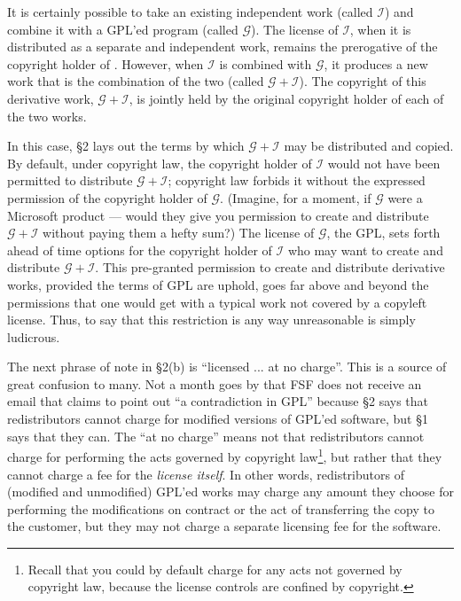 \documentclass[12pt]{report}
\begin{document}
\newcommand{\gplusi}{$\mathcal{G\!\!+\!\!I}$}
\newcommand{\worki}{$\mathcal{I}$}
\newcommand{\workg}{$\mathcal{G}$}

It is certainly possible to take an existing independent work (called
\worki{}) and combine it with a GPL'ed program (called \workg{}).  The
license of \worki{}, when it is distributed as a separate and independent
work, remains the prerogative of the copyright holder of .  However, when
\worki{} is combined with \workg{}, it produces a new work that is the
combination of the two (called \gplusi{}).  The copyright of this
derivative work, \gplusi{}, is jointly held by the original copyright
holder of each of the two works.

In this case, \S 2 lays out the terms by which \gplusi{} may be
distributed and copied.  By default, under copyright law, the copyright
holder of \worki{} would not have been permitted to distribute \gplusi{};
copyright law forbids it without the expressed permission of the copyright
holder of \workg{}.  (Imagine, for a moment, if \workg{} were a Microsoft
product --- would they give you permission to create and distribute
\gplusi{} without paying them a hefty sum?)  The license of \workg{}, the
GPL, sets forth ahead of time options for the copyright holder of \worki{}
who may want to create and distribute \gplusi{}.  This pre-granted
permission to create and distribute derivative works, provided the terms
of GPL are uphold, goes far above and beyond the permissions that one
would get with a typical work not covered by a copyleft license.  Thus, to
say that this restriction is any way unreasonable is simply ludicrous.

\medskip

The next phrase of note in \S 2(b) is ``licensed ... at no charge''.  This
is a source of great confusion to many.  Not a month goes by that FSF does
not receive an email that claims to point out ``a contradiction in GPL''
because \S 2 says that redistributors cannot charge for modified versions
of GPL'ed software, but \S 1 says that they can.  The ``at no charge''
means not that redistributors cannot charge for performing the acts
governed by copyright law\footnote{Recall that you could by default charge
  for any acts not governed by copyright law, because the license controls
  are confined by copyright.}, but rather that they cannot charge a fee
for the \emph{license itself}.  In other words, redistributors of
(modified and unmodified) GPL'ed works may charge any amount they choose
for performing the modifications on contract or the act of transferring
the copy to the customer, but they may not charge a separate licensing fee
for the software.
\end{document}
